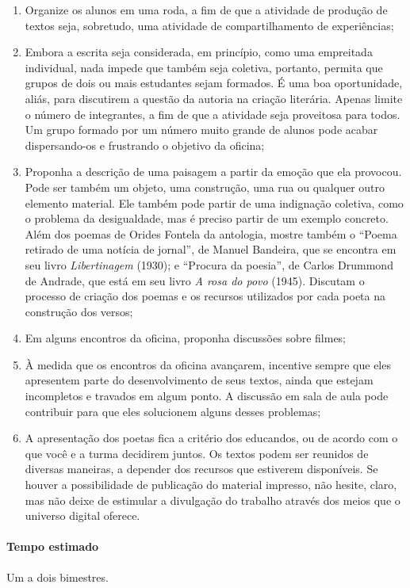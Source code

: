 \documentclass[12pt]{extarticle}
\begin{document}
\begin{enumerate}
\item
  Organize os alunos em uma roda, a fim de que a atividade de produção
  de textos seja, sobretudo, uma atividade de compartilhamento de
  experiências;
\item
  Embora a escrita seja considerada, em princípio, como uma empreitada
  individual, nada impede que também seja coletiva, portanto, permita
  que grupos de dois ou mais estudantes sejam formados. É uma boa
  oportunidade, aliás, para discutirem a questão da autoria na criação
  literária. Apenas limite o número de integrantes, a fim de que a
  atividade seja proveitosa para todos. Um grupo formado por um número
  muito grande de alunos pode acabar dispersando-os e frustrando o
  objetivo da oficina;
\item
  Proponha a descrição de uma paisagem a partir da emoção que ela
  provocou. Pode ser também um objeto, uma construção, uma rua ou
  qualquer outro elemento material. Ele também pode partir de uma
  indignação coletiva, como o problema da desigualdade, mas é preciso
  partir de um exemplo concreto. Além dos poemas de Orides Fontela da
  antologia, mostre também o ``Poema retirado de uma notícia de
  jornal'', de Manuel Bandeira, que se encontra em seu livro
  \emph{Libertinagem} (1930); e ``Procura da poesia'', de Carlos
  Drummond de Andrade, que está em seu livro \emph{A rosa do povo}
  (1945). Discutam o processo de criação dos poemas e os recursos
  utilizados por cada poeta na construção dos versos;
\item
  Em alguns encontros da oficina, proponha discussões sobre filmes;
\item
  À medida que os encontros da oficina avançarem, incentive sempre que
  eles apresentem parte do desenvolvimento de seus textos, ainda que
  estejam incompletos e travados em algum ponto. A discussão em sala de
  aula pode contribuir para que eles solucionem alguns desses problemas;
\item
  A apresentação dos poetas fica a critério dos educandos, ou de acordo
  com o que você e a turma decidirem juntos. Os textos podem ser
  reunidos de diversas maneiras, a depender dos recursos que estiverem
  disponíveis. Se houver a possibilidade de publicação do material
  impresso, não hesite, claro, mas não deixe de estimular a divulgação
  do trabalho através dos meios que o universo digital oferece.
\end{enumerate}

\paragraph{Tempo estimado} Um a dois bimestres.
\end{document}
